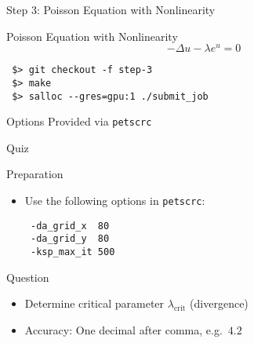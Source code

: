 

\begin{frame}[fragile]{Step 3: Poisson Equation with Nonlinearity}

  \begin{block}{Poisson Equation with Nonlinearity}
    \begin{equation*}
      - \Delta u - \lambda e^u = 0
    \end{equation*}

 \begin{lstlisting}
 $> git checkout -f step-3
 $> make
 $> salloc --gres=gpu:1 ./submit_job
 \end{lstlisting}
  \end{block}

  \begin{block}{Options}
    Provided via \lstinline|petscrc|
  \end{block}

\end{frame}


\begin{frame}[fragile]{Quiz}

  \begin{block}{Preparation}
    \begin{itemize}
     \item Use the following options in \lstinline|petscrc|:
 \begin{lstlisting}
 -da_grid_x  80
 -da_grid_y  80
 -ksp_max_it 500
 \end{lstlisting}
    \end{itemize}
  \end{block}

  \begin{block}{Question}
    \begin{itemize}
     \item Determine critical parameter $\lambda_{\mathrm{crit}}$ (divergence)
     \item Accuracy: One decimal after comma, e.g.~$4.2$
    \end{itemize}
  \end{block}

\end{frame}



